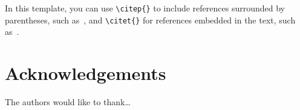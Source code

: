 \documentclass{article}
\begin{document}
In this template, you can use \verb=\citep{}= to include references
surrounded by parentheses, such as~\citep{Author:00}, and \verb=\citet{}=
for references embedded in the text, such as~\cite{Author:00}.

\section{Acknowledgements}

The authors would like to thank\dots



%
%
%
%
\end{document}
